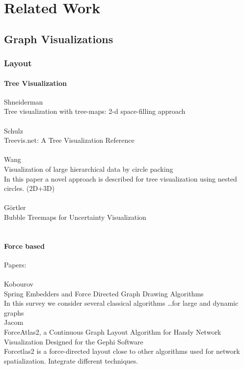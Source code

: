 \chapter{Related Work}

\section{Graph Visualizations}

\subsection{Layout}

\subsubsection{Tree Visualization}

Shneiderman \\
Tree visualization with tree-maps: 2-d space-filling approach\\
\\
Schulz\\
Treevis.net: A Tree Visualization Reference\\
\\
Wang\\
Visualization of large hierarchical data by circle packing\\
In this paper a novel approach is described for tree visualization using nested circles. (2D+3D)\\
\\
Görtler\\
Bubble Treemaps for Uncertainty Visualization\\
\\

\subsubsection{Force based}
Papers:\\
\\
Kobourov\\
Spring Embedders and Force Directed Graph Drawing Algorithms\\
In this survey we consider several classical algorithms \dots for large and dynamic graphs\\

Jacom\\
ForceAtlas2, a Continuous Graph Layout Algorithm for Handy Network Visualization Designed for the Gephi Software\\
Forcetlas2 is a force-directed layout close to other algorithms used for network spatialization. Integrate different techniques.\\
\\


